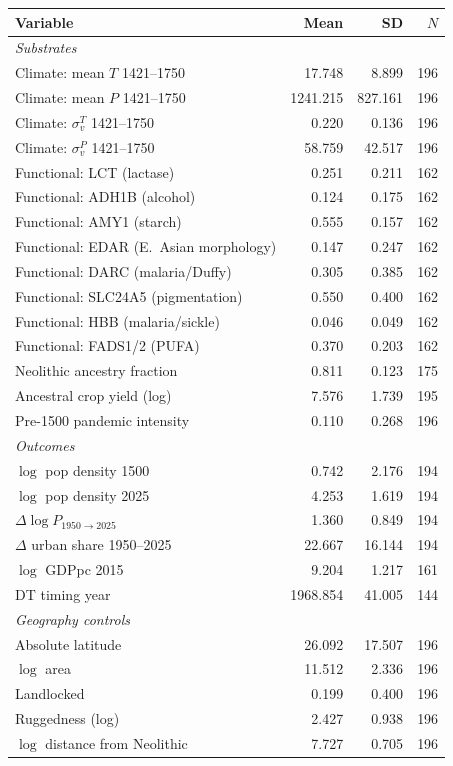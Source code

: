 \begin{tabular}{lrrr}
\toprule
Variable & Mean & SD & $N$ \\
\midrule
\multicolumn{4}{l}{\textit{Substrates}} \\
\quad Climate: mean $T$ 1421--1750 & 17.748 & 8.899 & 196 \\
\quad Climate: mean $P$ 1421--1750 & 1241.215 & 827.161 & 196 \\
\quad Climate: $\sigma_v^T$ 1421--1750 & 0.220 & 0.136 & 196 \\
\quad Climate: $\sigma_v^P$ 1421--1750 & 58.759 & 42.517 & 196 \\
\quad Functional: LCT (lactase) & 0.251 & 0.211 & 162 \\
\quad Functional: ADH1B (alcohol) & 0.124 & 0.175 & 162 \\
\quad Functional: AMY1 (starch) & 0.555 & 0.157 & 162 \\
\quad Functional: EDAR (E.\ Asian morphology) & 0.147 & 0.247 & 162 \\
\quad Functional: DARC (malaria/Duffy) & 0.305 & 0.385 & 162 \\
\quad Functional: SLC24A5 (pigmentation) & 0.550 & 0.400 & 162 \\
\quad Functional: HBB (malaria/sickle) & 0.046 & 0.049 & 162 \\
\quad Functional: FADS1/2 (PUFA) & 0.370 & 0.203 & 162 \\
\quad Neolithic ancestry fraction & 0.811 & 0.123 & 175 \\
\quad Ancestral crop yield (log) & 7.576 & 1.739 & 195 \\
\quad Pre-1500 pandemic intensity & 0.110 & 0.268 & 196 \\
\midrule
\multicolumn{4}{l}{\textit{Outcomes}} \\
\quad $\log$ pop density 1500 & 0.742 & 2.176 & 194 \\
\quad $\log$ pop density 2025 & 4.253 & 1.619 & 194 \\
\quad $\Delta\log P_{1950\to2025}$ & 1.360 & 0.849 & 194 \\
\quad $\Delta$ urban share 1950--2025 & 22.667 & 16.144 & 194 \\
\quad $\log$ GDPpc 2015 & 9.204 & 1.217 & 161 \\
\quad DT timing year & 1968.854 & 41.005 & 144 \\
\midrule
\multicolumn{4}{l}{\textit{Geography controls}} \\
\quad Absolute latitude & 26.092 & 17.507 & 196 \\
\quad $\log$ area & 11.512 & 2.336 & 196 \\
\quad Landlocked & 0.199 & 0.400 & 196 \\
\quad Ruggedness (log) & 2.427 & 0.938 & 196 \\
\quad $\log$ distance from Neolithic & 7.727 & 0.705 & 196 \\
\bottomrule
\end{tabular}
